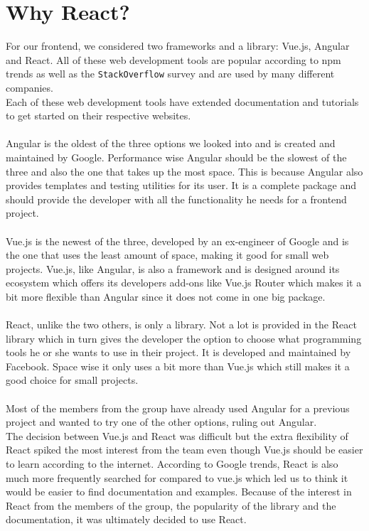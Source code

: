 \section{Why React?}
For our frontend, we considered two frameworks and a library: Vue.js, Angular and React.
All of these web development tools are popular according to npm trends as well as the \texttt{StackOverflow} survey and are used by many different companies\cite{VueReactAngular}.
\\
Each of these web development tools have extended documentation and tutorials to get started on their respective websites.
\\\\
Angular is the oldest of the three options we looked into and is created and maintained by Google\cite{AngularHistory}.
Performance wise Angular should be the slowest of the three and also the one that takes up the most space\cite{VueReactAngular}.
This is because Angular also provides templates and testing utilities for its user.
It is a complete package and should provide the developer with all the functionality he needs for a frontend project.
\\\\
Vue.js is the newest of the three, developed by an ex-engineer of Google and is the one that uses the least amount of space, making it good for small web projects\cite{ComparisonWithOtherFrameworks}.
Vue.js, like Angular, is also a framework and is designed around its ecosystem which offers its developers add-ons like Vue.js Router which makes it a bit more flexible than Angular since it does not come in one big package.
\\\\
React, unlike the two others, is only a library\cite{ReactJS}.
Not a lot is provided in the React library which in turn gives the developer the option to choose what programming tools he or she wants to use in their project.
It is developed and maintained by Facebook\cite{ReactHistory}.
Space wise it only uses a bit more than Vue.js which still makes it a good choice for small projects.
\\\\
Most of the members from the group have already used Angular for a previous project and wanted to try one of the other options, ruling out Angular. 
\\
The decision between Vue.js and React was difficult but the extra flexibility of React spiked the most interest from the team even though Vue.js should be easier to learn according to the internet\cite{ComparisonWithOtherFrameworks}.
According to Google trends\cite{VueReactAngular}, React is also much more frequently searched for compared to vue.js which led us to think it would be easier to find documentation and examples.
Because of the interest in React from the members of the group, the popularity of the library and the documentation, it was ultimately decided to use React.
